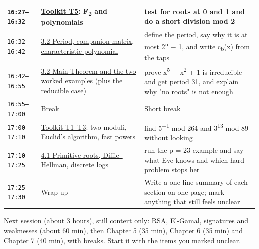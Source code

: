 \documentclass[11pt,a4paper]{article}
\begin{document}
\begin{xltabular}{\linewidth}{|l|>{\raggedright\arraybackslash}X|>{\raggedright\arraybackslash}X|}
\texttt{16:27–16:32} & \hyperref[toolkit]{Toolkit T5}: F\textsubscript{2} and polynomials & test for roots at 0 and 1 and do a short division mod 2 \\ \hline
\texttt{16:32–16:42} & \hyperref[ch3-period]{3.2 Period, companion matrix, characteristic polynomial} & define the period, say why it is at most 2\textsuperscript{n} \ensuremath{-} 1, and write c\textsubscript{b}(x) from the taps \\ \hline
\texttt{16:42–16:55} & \hyperref[ch3-period]{3.2 Main Theorem and the two worked examples} (plus the reducible case) & prove x\textsuperscript{5} + x\textsuperscript{2} + 1 is irreducible and get period 31, and explain why "no roots" is not enough \\ \hline
\texttt{16:55–17:00} & Break & Short break \\ \hline
\texttt{17:00–17:10} & \hyperref[toolkit]{Toolkit T1–T3}: two moduli, Euclid's algorithm, fast powers & find 5\textsuperscript{\ensuremath{-}1} mod 264 and 3\textsuperscript{13} mod 89 without looking \\ \hline
\texttt{17:10–17:25} & \hyperref[ch4]{4.1 Primitive roots, Diffie–Hellman, discrete logs} & run the p = 23 example and say what Eve knows and which hard problem stops her \\ \hline
\texttt{17:25–17:30} & Wrap-up & Write a one-line summary of each section on one page; mark anything that still feels unclear \\ \hline
\end{xltabular}
{\small\color{black!70} Next session (about 3 hours), still content only: \hyperref[ch4-rsa]{RSA}, \hyperref[ch4-eg]{El-Gamal}, \hyperref[ch4-sig]{signatures} and \hyperref[ch4-weak]{weaknesses} (about 60 min), then \hyperref[ch5]{Chapter 5} (35 min), \hyperref[ch6]{Chapter 6} (35 min) and \hyperref[ch7]{Chapter 7} (40 min), with breaks. Start it with the items you marked unclear.}\par
\end{document}
